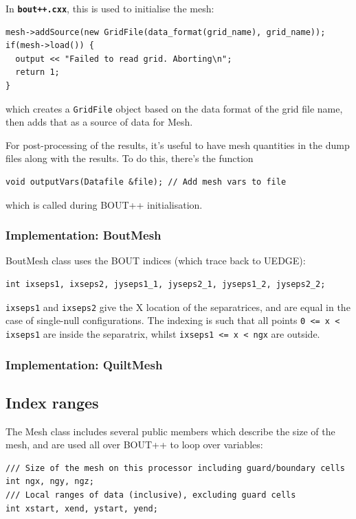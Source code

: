 \documentclass[12pt]{article}
\newcommand{\code}[1]{\texttt{#1}}
\newcommand{\file}[1]{\texttt{\bf #1}}
\begin{document}
In \file{bout++.cxx}, this is used to initialise the mesh:
\begin{lstlisting}
mesh->addSource(new GridFile(data_format(grid_name), grid_name));
if(mesh->load()) {
  output << "Failed to read grid. Aborting\n";
  return 1;
}
\end{lstlisting}
which creates a \code{GridFile} object based on the data format of 
the grid file name, then adds that as a source of data for Mesh.

For post-processing of the results, it's useful to have 
mesh quantities in the dump files along with the results. To do this,
there's the function
\begin{lstlisting}
void outputVars(Datafile &file); // Add mesh vars to file
\end{lstlisting}
which is called during BOUT++ initialisation.

\subsubsection{Implementation: BoutMesh}

BoutMesh class uses the BOUT indices (which trace back to UEDGE):
\begin{lstlisting}
int ixseps1, ixseps2, jyseps1_1, jyseps2_1, jyseps1_2, jyseps2_2;
\end{lstlisting}
\code{ixseps1} and \code{ixseps2} give the X location of the separatrices,
and are equal in the case of single-null configurations. The indexing
is such that all points \code{0 <= x < ixseps1} are inside the separatrix,
whilst \code{ixseps1 <= x < ngx} are outside.

\subsubsection{Implementation: QuiltMesh}





\subsection{Index ranges}

The Mesh class includes several public members which describe the
size of the mesh, and are used all over BOUT++ to loop over variables:
\begin{lstlisting}
/// Size of the mesh on this processor including guard/boundary cells
int ngx, ngy, ngz;  
/// Local ranges of data (inclusive), excluding guard cells
int xstart, xend, ystart, yend;
\end{lstlisting}
\end{document}
